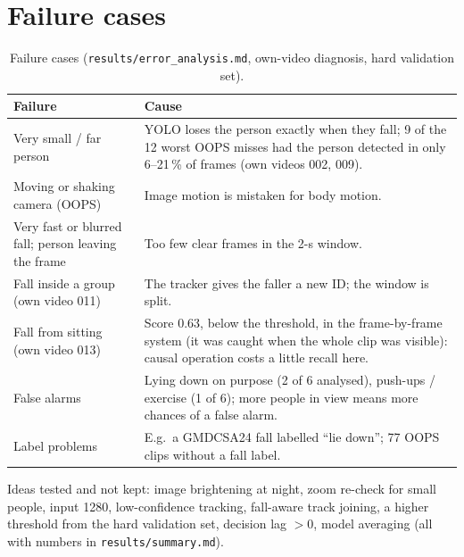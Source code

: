 \documentclass[11pt,a4paper]{article}
\newcommand{\code}[1]{\texttt{\small #1}}
\begin{document}
\section{Failure cases}
\begin{table}[H]\centering\small
\begin{tabularx}{\textwidth}{@{}>{\raggedright\arraybackslash}p{4.2cm}X@{}}\toprule
\textbf{Failure} & \textbf{Cause} \\ \midrule
Very small / far person & YOLO loses the person exactly when they fall; 9 of the 12 worst OOPS misses had the person detected in only 6--21\,\% of frames (own videos 002, 009). \\
Moving or shaking camera (OOPS) & Image motion is mistaken for body motion. \\
Very fast or blurred fall; person leaving the frame & Too few clear frames in the 2-s window. \\
Fall inside a group (own video 011) & The tracker gives the faller a new ID; the window is split. \\
Fall from sitting (own video 013) & Score 0.63, below the threshold, in the frame-by-frame system (it was caught when the whole clip was visible): causal operation costs a little recall here. \\
False alarms & Lying down on purpose (2 of 6 analysed), push-ups / exercise (1 of 6); more people in view means more chances of a false alarm. \\
Label problems & E.g.\ a GMDCSA24 fall labelled ``lie down''; 77 OOPS clips without a fall label. \\
\bottomrule\end{tabularx}
\caption{Failure cases (\code{results/error\_analysis.md}, own-video diagnosis, hard validation set).}
\end{table}
Ideas tested and not kept: image brightening at night, zoom re-check for small people, input 1280, low-confidence
tracking, fall-aware track joining, a higher threshold from the hard validation set, decision lag $>0$, model
averaging (all with numbers in \code{results/summary.md}).
\end{document}
